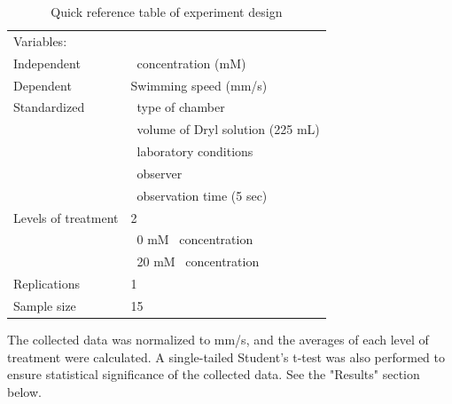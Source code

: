 \documentclass[12pt]{article}
\newcommand{\kcl}{\ce{KCl}}
\begin{document}
	\begin{table}[h]
		\centering
		\begin{tabular}{|l|l|}
			\hline
			Variables:&\\
			\qquad Independent & \kcl\ concentration (mM) \\ \hline
			\qquad Dependent & Swimming speed (mm/s)\\ \hline
			\qquad Standardized & \quad\textbullet\ type of chamber\\ 
			& \quad\textbullet\ volume of Dryl solution (225 mL) \\
			& \quad\textbullet\ laboratory conditions \\
			& \quad\textbullet\ observer \\
			& \quad\textbullet\ observation time (5 sec)\\ \hline
			Levels of treatment & 2\\
			& \quad\textbullet\ 0 mM \kcl\ concentration \\
			& \quad\textbullet\ 20 mM \kcl\ concentration\\ \hline
			Replications & 1 \\ \hline
			Sample size & 15 \\
			\hline
		\end{tabular}
		\caption{Quick reference table of experiment design}
		\label{refTable}
	\end{table}
	
	The collected data was normalized to mm/s, and the averages of each level of treatment were calculated. A single-tailed Student's t-test was also performed to ensure statistical significance of the collected data. See the "Results" section below. 
	
\end{document}
